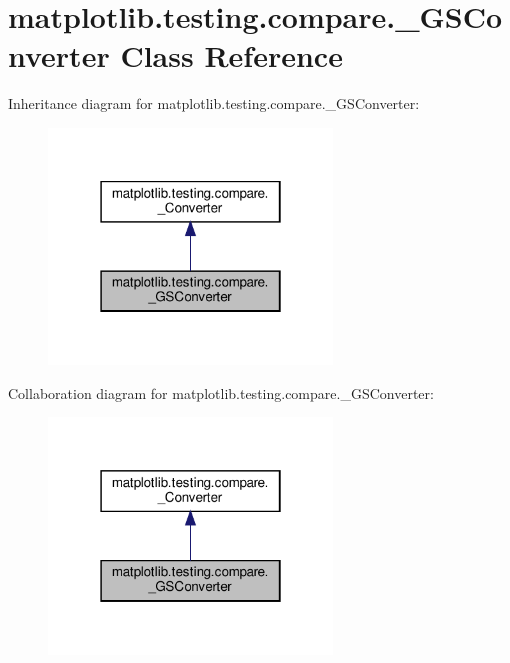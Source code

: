 \hypertarget{classmatplotlib_1_1testing_1_1compare_1_1__GSConverter}{}\section{matplotlib.\+testing.\+compare.\+\_\+\+G\+S\+Converter Class Reference}
\label{classmatplotlib_1_1testing_1_1compare_1_1__GSConverter}


Inheritance diagram for matplotlib.\+testing.\+compare.\+\_\+\+G\+S\+Converter\+:
\nopagebreak
\begin{figure}[H]
\begin{center}
\leavevmode
\includegraphics[width=214pt]{classmatplotlib_1_1testing_1_1compare_1_1__GSConverter__inherit__graph}
\end{center}
\end{figure}


Collaboration diagram for matplotlib.\+testing.\+compare.\+\_\+\+G\+S\+Converter\+:
\nopagebreak
\begin{figure}[H]
\begin{center}
\leavevmode
\includegraphics[width=214pt]{classmatplotlib_1_1testing_1_1compare_1_1__GSConverter__coll__graph}
\end{center}
\end{figure}
